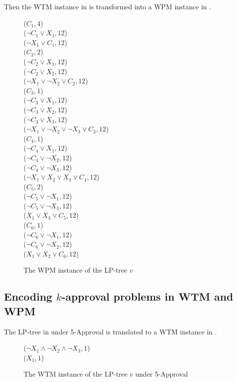 Then the WTM instance in  is transformed into
a WPM instance in .
\begin{figure}[ht!]
   \small
	\begin{framed}
		($C_1,4$)\\
		($\neg C_1 \vee X_1, 12$)\\
		($\neg X_1 \vee C_1, 12$)\\
		($C_2, 2$)\\
		($\neg C_2 \vee X_1, 12$)\\
		($\neg C_2 \vee X_2, 12$)\\
		($\neg X_1 \vee \neg X_2 \vee C_2, 12$)\\
		($C_3, 1$)\\
		($\neg C_3 \vee X_1, 12$)\\
		($\neg C_3 \vee X_2, 12$)\\
		($\neg C_3 \vee X_3, 12$)\\
		($\neg X_1 \vee \neg X_2 \vee \neg X_3 \vee C_3, 12$)\\
		($C_4, 1$)\\
		($\neg C_4 \vee X_1, 12$)\\
		($\neg C_4 \vee \neg X_2, 12$)\\
		($\neg C_4 \vee \neg X_3, 12$)\\
		($\neg X_1 \vee X_2 \vee X_3 \vee C_4, 12$)\\
		($C_5, 2$)\\
		($\neg C_5 \vee \neg X_1, 12$)\\
		($\neg C_5 \vee \neg X_3, 12$)\\
		($X_1 \vee X_3 \vee C_5, 12$)\\
		($C_6, 1$)\\
		($\neg C_6 \vee \neg X_1, 12$)\\
		($\neg C_6 \vee \neg X_2, 12$)\\
		($X_1 \vee X_2 \vee C_6, 12$)
	\end{framed}
	\caption{The WPM instance of the LP-tree $v$}
  \label{fig:borda_wpm}
\end{figure}




\subsection{Encoding $k$-approval problems in WTM and WPM}
The LP-tree in  under 5-Approval is translated to a WTM instance
in .
\begin{figure}[H]
   \small
	\begin{framed}
		($\neg X_1 \wedge \neg X_2 \wedge \neg X_3,1$)\\
		($X_1, 1$)
	\end{framed}
	\caption{The WTM instance of the LP-tree $v$ under 5-Approval}
  \label{fig:app_wtm}
\end{figure}

